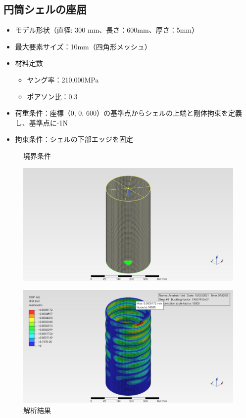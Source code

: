 \documentclass[a4j,20pt,slide]{ltjsarticle}
\begin{document}
\subsection{円筒シェルの座屈}
\begin{itemize}
	\item モデル形状（直径: 300 mm、長さ：600mm、厚さ：5mm）
	\item 最大要素サイズ：10mm（四角形メッシュ）
	\item 材料定数
	      \begin{itemize}
		      \item ヤング率：210,000MPa
		      \item ポアソン比：0.3
	      \end{itemize}
	\item 荷重条件：座標（0, 0, 600）の基準点からシェルの上端と剛体拘束を定義し、基準点に-1N
	\item 拘束条件：シェルの下部エッジを固定
\end{itemize}
\vspace{-\baselineskip}
\begin{figure}[H]
	\begin{minipage}{.49\hsize}
		\caption{境界条件}
		\label{09-01}
		\centering
		\includegraphics[width=.95\columnwidth]{fig/09-01.png}
	\end{minipage}
	\begin{minipage}{.49\hsize}
		\caption{解析結果}
		\label{09-02}
		\centering
		\includegraphics[width=.95\columnwidth]{fig/09-02.png}
	\end{minipage}
\end{figure}
\clearpage
%
\end{document}
